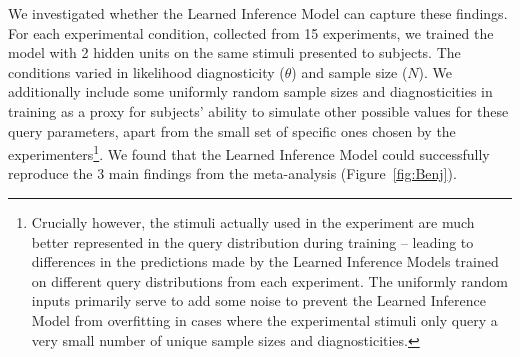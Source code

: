 We investigated whether the Learned Inference Model can capture these findings. For each experimental condition, collected from 15 experiments, we trained the model with 2 hidden units on the same stimuli presented to subjects. The conditions varied in likelihood diagnosticity ($\theta$) and sample size ($N$). We additionally include some uniformly random sample sizes and diagnosticities in training as a proxy for subjects' ability to simulate other possible values for these query parameters, apart from the small set of specific ones chosen by the experimenters\footnote{Crucially however, the stimuli actually used in the experiment are much better represented in the query distribution during training -- leading to differences in the predictions made by the Learned Inference Models trained on different query distributions from each experiment. The uniformly random inputs primarily serve to add some noise to prevent the Learned Inference Model from overfitting in cases where the experimental stimuli only query a very small number of unique sample sizes and diagnosticities.}. We found that the Learned Inference Model could successfully reproduce the 3 main findings from the \citet{benjamin18} meta-analysis (Figure~\ref{fig:Benj}).
%
%
%
%


